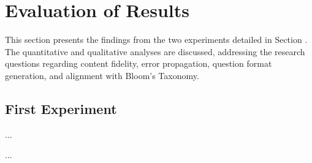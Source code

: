\section{Evaluation of Results} \label{sec:evaluation}

This section presents the findings from the two experiments detailed in Section . The quantitative and qualitative analyses are discussed, addressing the research questions regarding content fidelity, error propagation, question format generation, and alignment with Bloom's Taxonomy.


\subsection{First Experiment}
\label{sec:first-experiment}

 ...



...





